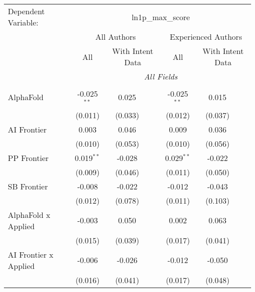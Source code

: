\begingroup
\centering
\begin{tabular}{lcccccc}
   \tabularnewline \midrule \midrule
   Dependent Variable: & \multicolumn{6}{c}{ln1p\_max\_score}\\
 & \multicolumn{3}{c}{All Authors} & \multicolumn{3}{c}{Experienced Authors} \\
\cmidrule(lr){2-4} \cmidrule(lr){5-7}
 & \multicolumn{1}{c}{All} & \multicolumn{2}{c}{With Intent Data} & \multicolumn{1}{c}{All} & \multicolumn{2}{c}{With Intent Data} \\
\cmidrule(lr){2-2} \cmidrule(lr){3-4} \cmidrule(lr){5-5} \cmidrule(lr){6-7}
 & \multicolumn{6}{c}{\textit{All Fields}} \\ \\
   AlphaFold                      & -0.025$^{**}$ & 0.025         &               & -0.025$^{**}$ & 0.015   &   \\   
                                  & (0.011)       & (0.033)       &               & (0.012)       & (0.037) &   \\   
   AI Frontier                    & 0.003         & 0.046         &               & 0.009         & 0.036   &   \\   
                                  & (0.010)       & (0.053)       &               & (0.010)       & (0.056) &   \\   
   PP Frontier                    & 0.019$^{**}$  & -0.028        &               & 0.029$^{**}$  & -0.022  &   \\   
                                  & (0.009)       & (0.046)       &               & (0.011)       & (0.050) &   \\   
   SB Frontier                    & -0.008        & -0.022        &               & -0.012        & -0.043  &   \\   
                                  & (0.012)       & (0.078)       &               & (0.011)       & (0.103) &   \\   
   AlphaFold x Applied            & -0.003        & 0.050         &               & 0.002         & 0.063   &   \\   
                                  & (0.015)       & (0.039)       &               & (0.017)       & (0.041) &   \\   
   AI Frontier x Applied          & -0.006        & -0.026        &               & -0.012        & -0.050  &   \\   
                                  & (0.016)       & (0.041)       &               & (0.017)       & (0.048) &   \\   

\end{tabular}
